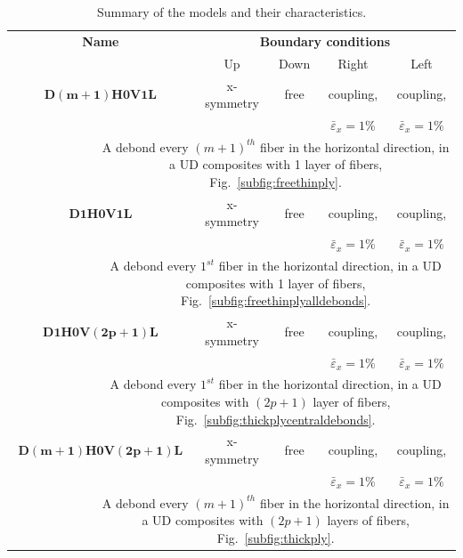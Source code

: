 \documentclass[review]{elsarticle}
\begin{document}
\begin{table}[!h]
 \centering
 \caption{Summary of the models and their characteristics.}
 \begin{tabularx}{\textwidth}{p{}ccccc}
\multicolumn{2}{c}{\textbf{Name}} & \multicolumn{4}{c}{\textbf{Boundary conditions}}\\
                                                         &  & Up & Down & Right & Left \\
\toprule
\midrule
\multicolumn{2}{c}{$\mathbf{D\left(m+1\right)H0V1L}$} &x-symmetry&free&coupling,&coupling,\\
                                                         &  &  &  & $\bar{\varepsilon}_{x}=1\%$ & $\bar{\varepsilon}_{x}=1\%$ \\
&\multicolumn{5}{X}{\small A debond every $\left(m+1\right)^{th}$ fiber in the horizontal direction, in a UD composites with 1 layer of fibers, Fig.~\ref{subfig:freethinply}.}\\
\midrule
\multicolumn{2}{c}{$\mathbf{D1H0V1L}$} &x-symmetry&free&coupling,&coupling,\\
                                                         &  &  &  & $\bar{\varepsilon}_{x}=1\%$ & $\bar{\varepsilon}_{x}=1\%$ \\
&\multicolumn{5}{X}{\small A debond every $1^{st}$ fiber in the horizontal direction, in a UD composites with 1 layer of fibers, Fig.~\ref{subfig:freethinplyalldebonds}.}\\
\midrule
\multicolumn{2}{c}{$\mathbf{D1H0V\left(2p+1\right)L}$} &x-symmetry&free&coupling,&coupling,\\
                                                         &  &  &  & $\bar{\varepsilon}_{x}=1\%$ & $\bar{\varepsilon}_{x}=1\%$ \\
&\multicolumn{5}{X}{\small A debond every $1^{st}$ fiber in the horizontal direction, in a UD composites with $\left(2p+1\right)$ layer of fibers, Fig.~\ref{subfig:thickplycentraldebonds}.}\\
\midrule
\multicolumn{2}{c}{$\mathbf{D\left(m+1\right)H0V\left(2p+1\right)L}$} &x-symmetry&free&coupling,&coupling,\\
                                                         &  &  &  & $\bar{\varepsilon}_{x}=1\%$ & $\bar{\varepsilon}_{x}=1\%$ \\
&\multicolumn{5}{X}{\small A debond every $\left(m+1\right)^{th}$ fiber in the horizontal direction, in a UD composites with $\left(2p+1\right)$ layers of fibers, Fig.~\ref{subfig:thickply}.}\\

\end{tabularx}
\end{table}
\end{document}
